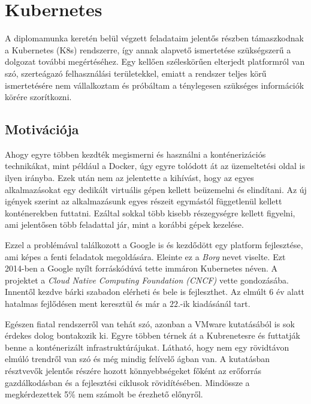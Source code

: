 \chapter{Kubernetes}
\label{sec:Kubernetes}
A diplomamunka keretén belül végzett feladataim jelentős részben támaszkodnak a Kubernetes (K8s) rendszerre, így annak alapvető ismertetése szükségszerű a dolgozat további megértéséhez.
Egy kellően széleskörűen elterjedt platformról van szó, szerteágazó felhasználási területekkel, emiatt a rendszer teljes körű ismertetésére nem vállalkoztam és próbáltam a ténylegesen szükséges információk körére szorítkozni.

\section{Motivációja}
Ahogy egyre többen kezdték megismerni és használni a konténerizációs technikákat, mint például a Docker, úgy egyre tolódott át az üzemeltetési oldal is ilyen irányba. Ezek után nem  az jelentette a kihívást, hogy az egyes alkalmazásokat egy dedikált virtuális gépen kellett beüzemelni és elindítani. Az új igények szerint az alkalmazásunk egyes részeit egymástól függetlenül kellett konténerekben futtatni. Ezáltal sokkal több kisebb részegységre kellett figyelni, ami jelentősen több feladattal jár, mint a korábbi gépek kezelése. 

Ezzel a problémával találkozott a Google is és kezdődött egy platform fejlesztése, ami képes a fenti feladatok megoldására. Eleinte ez a \textit{Borg}\citep{Borg} nevet viselte. Ezt 2014-ben a Google nyílt forráskódúvá tette immáron Kubernetes néven. A projektet a \textit{Cloud Native Computing Foundation (CNCF)}\citep{cncf} vette gondozásába. Innentől kezdve bárki szabadon elérheti és bele is fejleszthet. Az elmúlt 6 év alatt hatalmas fejlődésen ment keresztül és már a $22$.-ik kiadásánál tart.

Egészen fiatal rendszerről van tehát szó, azonban a VMware kutatásából\citep{VMwareSurvey} is sok érdekes dolog bontakozik ki. Egyre többen térnek át a Kubrenetesre és futtatják benne a konténerizált infrastruktúrájukat. Látható, hogy nem egy rövidtávon elmúló trendről van szó és még mindig felívelő ágban van. A kutatásban résztvevők jelentős részére hozott könnyebbségeket főként az erőforrás gazdálkodásban és a fejlesztési ciklusok rövidítésében. Mindössze a megkérdezettek 5\% nem számolt be érezhető előnyről.  

